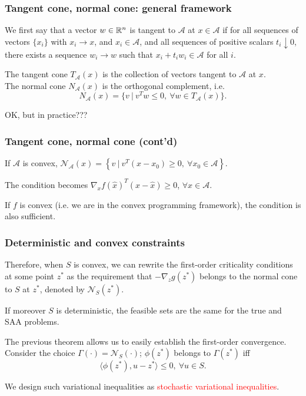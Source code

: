 \documentclass{beamer}
\begin{document}
\begin{frame}
\frametitle{Tangent cone, normal cone: general framework}

We first say that a vector $w \in \mathbb{R}^n$ is tangent to $\mathcal{A}$ at $x \in \mathcal{A}$ if for all sequences of vectors $\lbrace x_i \rbrace$ with $x_i \rightarrow x$, and $x_i \in \mathcal{A}$, and all sequences of positive scalars $t_i \downarrow 0$, there exists a sequence $w_i \rightarrow w$ such that $x_i + t_iw_i \in \mathcal{A}$ for all $i$.

\mbox{}

The {\red tangent cone $T_{\mathcal{A}}(x)$} is the collection of vectors tangent to ${\mathcal{A}}$ at $x$. \\
The {\red normal cone $N_{\mathcal{A}}(x)$} is the orthogonal complement, i.e.
\[
N_{\mathcal{A}}(x) = \lbrace v\ |\ v^Tw \leq 0,\ \forall w \in T_{\mathcal{A}}(x) \rbrace.
\]

\mbox{}

OK, but in practice???

\end{frame}

\begin{frame}
\frametitle{Tangent cone, normal cone (cont'd)}

If ${\mathcal{A}}$ is convex,
$
\mathcal{N}_{\mathcal{A}}(x) = \left\lbrace v\ |\ v^T(x-x_0) \geq 0,\ \forall x_0 \in
{\mathcal{A}} \right\rbrace.
$

\mbox{}

The condition becomes
$\nabla_x f(\hat{x})^T (x-\hat{x}) \geq 0$, $\forall x \in {\mathcal{A}}$.

\mbox{}

If $f$ is convex (i.e. we are in the convex programming framework), the condition is also sufficient.

\end{frame}

\begin{frame}
\frametitle{Deterministic and convex constraints}

Therefore, when $S$ is convex, we can rewrite the first-order criticality conditions at some point $z^*$ as the requirement that $-\nabla_z g(z^*)$ belongs to the normal cone to $S$ at $z^*$, denoted by $\mathcal{N}_{S}(z^*)$.

\mbox{}

If moreover $S$ is deterministic, the feasible sets are the same for the true and SAA problems.

\mbox{}

The previous theorem allows us to easily establish the first-order convergence.
Consider the choice $\Gamma(\cdot) = \mathcal{N}_S(\cdot)$; $\phi(z^*)$ belongs to $\Gamma(z^*)$ iff
\[
\langle \phi(z^*), u-z^*\rangle \leq 0,\ \forall u \in S.
\]

We design such variational inequalities as \textcolor{red}{stochastic variational inequalities}.

\end{frame}
\end{document}

